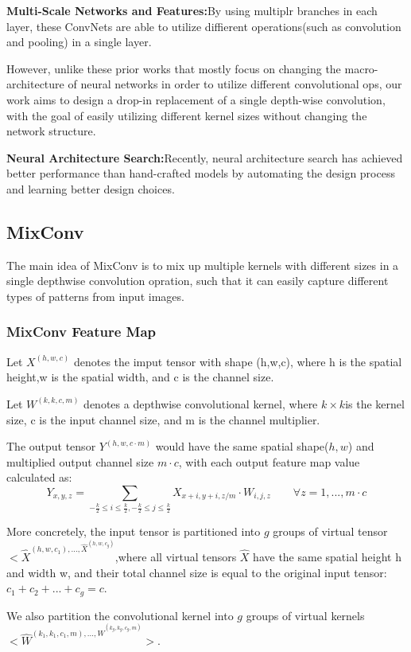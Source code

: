 \documentclass[11pt]{article}
\begin{document}
\textbf{Multi-Scale Networks and Features:}By using multiplr branches in each layer, these ConvNets are able to utilize diffierent operations(such as convolution and pooling) in a single layer.

However, unlike these prior works that mostly focus on changing the macro-architecture of neural networks in order to utilize different convolutional ops, our work aims to design a drop-in replacement of a single depth-wise convolution, with the goal of easily utilizing different kernel sizes without changing the network structure.

\textbf{Neural Architecture Search:}Recently, neural architecture search has achieved better performance than hand-crafted models by automating the design process and
learning better design choices.
\subsection{MixConv}
The main idea of MixConv is to mix up multiple kernels with different sizes in a single
depthwise convolution opration, such that it can easily capture different types of patterns from input images.

\subsubsection{MixConv Feature Map}
Let $X^{(h,w,c)}$ denotes the imput tensor with shape (h,w,c), where h is the spatial height,w is the spatial width, and c is the channel size.

Let $W^{(k,k,c,m)}$ denotes a depthwise convolutional kernel, where $k\times k$is the kernel size, c is the input channel size, and m is the channel multiplier. 

The output tensor $Y^{(h,w,c\cdot m)}$ would have the same spatial shape($h,w$) and multiplied output channel size $m\cdot c$, with each output feature map value calculated as:
$$Y_{x,y,z} = \sum_{-\frac{k}{2}\leq i \leq \frac{k}{2},-\frac{k}{2}\leq j \leq \frac{k}{2}}X_{x+i,y+i,z/m}\cdot W_{i,j,z} \qquad \forall z=1,...,m\cdot c$$

More concretely, the input tensor is partitioned into $g$ groups of virtual tensor $<\hat{X}^{(h,w,c_1),...,\hat{X}^{(h,w,c_g)}}$,where all virtual tensors $\hat{X}$ have the same spatial height h and width w, and their total channel size is equal to the original input tensor:$c_1+c_2+...+c_g=c$.

We also partition the convolutional kernel into $g$ groups of virtual kernels $<\hat{W}^{(k_1,k_1,c_1,m),...,\hat{W}^{(k_g,k_g,c_g,m)}}>$.
\end{document}
